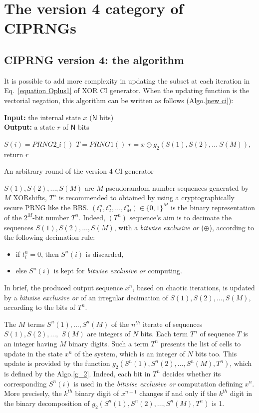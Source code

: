 \section{The version 4 category of CIPRNGs}
\subsection{CIPRNG version 4: the algorithm}

It is possible to add more complexity in updating the subset 
at each iteration
in Eq.~\ref{equation Oplus1} of XOR CI generator. 
When the updating function 
is the vectorial negation, this algorithm can be written as follows (Algo.\ref{new ci}):
\begin{algorithm}
\textbf{Input:} the internal state $x$ ($\mathsf{N}$ bits)\\
\textbf{Output:} a state $r$ of $\mathsf{N}$ bits
\begin{algorithmic}[1]
{
\STATE$S(i)= PRNG2\_i()$\;
}
\ENDFOR
\STATE$T = PRNG1()$\;
\STATE$r = x \oplus g_2(S(1),S(2),...~S(M))$,
\STATE return $r$\;
\medskip
\caption{An arbitrary round of the version 4 CI generator}
\label{new ci}
\end{algorithmic}
\end{algorithm}

$S(1), S(2), ..., S(M)$ are $M$ pseudorandom number sequences generated by $M$ XORshifts, $T^n$ is recommended to obtained by using a cryptographically secure
PRNG like the BBS. $(t_1^n,t_2^n,\dots,t_M^n)\in \{0,1\}^M$ is the binary representation of the $2^M$-bit number $T^n$.
Indeed, $(T^n)$ sequence's aim is to decimate
the sequences %
$S(1),S(2),..., S(M)$, with a \emph{bitwise exclusive or} ($\oplus$), according to the following decimation rule:
\begin{itemize}
\item if $t^n_i = 0$, then $S^n(i)$ is discarded,
\item else $S^n(i)$ is kept for \emph{bitwise exclusive or} computing.
\end{itemize}
In brief, the produced output sequence $x^n$, based on chaotic iterations, is updated by a \emph{bitwise exclusive or} of an irregular decimation of $S(1), S(2), ..., S(M)$, according to the bits of $T^n$.


The $M$ terms $S^n(1),..., S^n(M)$ of 
the $n^{th}$ iterate of sequences $S(1), S(2), ...,$ $S(M)$
are integers of $N$ bits. 
Each term $T^n$ of sequence $T$ is an integer having 
$M$ binary digits. 
Such a term $T^n$ presents the list of cells 
to update in the state $x^n$ of the system, which is an integer of $N$ bits too. 
This update is provided by the function $g_2(S^n(1),S^n(2), ..., S^n(M),T^n)$, 
which is defined by the Algo.\ref{g_2}. 
Indeed, each bit in $T^n$ decides whether its 
corresponding $S^n(i)$ is used in the \emph{bitwise exclusive or} computation defining $x^n$. 
More precisely, 
the $k^{th}$ binary digit of $x^{n-1}$ changes if and only if 
the $k^{th}$ digit in the binary decomposition of 
$g_2(S^n(1),S^n(2), ..., S^n(M),T^n)$ is 1.



